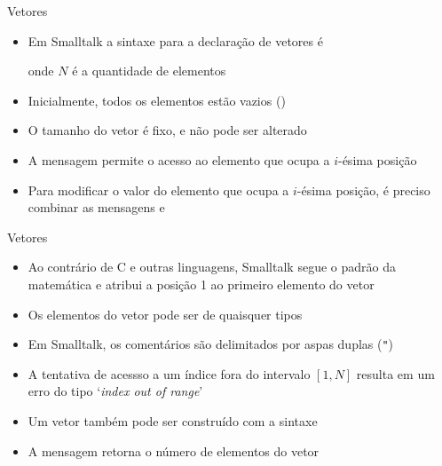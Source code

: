\begin{frame}[fragile]{Vetores}

    \begin{itemize}
        \item Em Smalltalk a sintaxe para a declaração de vetores é

        onde $N$ é a quantidade de elementos

        \item Inicialmente, todos os elementos estão vazios ()

        \item O tamanho do vetor é fixo, e não pode ser alterado

        \item A mensagem  permite o acesso ao elemento que ocupa a
            $i$-ésima posição


        \item Para modificar o valor do elemento que ocupa a $i$-ésima posição, é preciso
            combinar as mensagens  e 

    \end{itemize}

\end{frame}

\begin{frame}[fragile]{Vetores}

    \begin{itemize}
        \item Ao contrário de C e outras linguagens, Smalltalk segue o padrão da matemática
            e atribui a posição 1 ao primeiro elemento do vetor

        \item Os elementos do vetor pode ser de quaisquer tipos

        
        \item Em Smalltalk, os comentários são delimitados por aspas duplas (\texttt{"})

        \item A tentativa de acessso a um índice fora do intervalo $[1, N]$ resulta em um
            erro do tipo `\textit{index out of range}'

        \item Um vetor também pode ser construído com a sintaxe


        \item A mensagem  retorna o número de elementos do vetor

    \end{itemize}

\end{frame}

